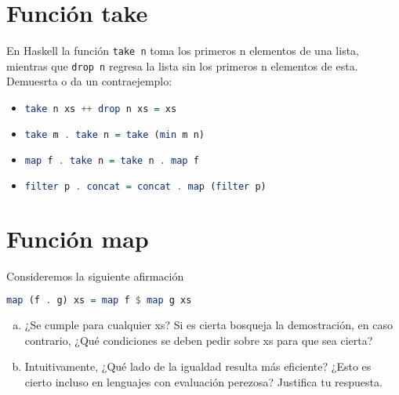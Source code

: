 \documentclass[spanish,12pt,letterpaper]{article}
\begin{document}
\section{Función take}
En Haskell la función \texttt{take n} toma los primeros n elementos de una lista,
mientras que \texttt{drop n} regresa la lista sin los primeros n elementos de
esta. Demuesrta o da un contraejemplo:
\begin{itemize}
\item
  \begin{lstlisting}[language=Haskell]
    take n xs ++ drop n xs = xs
  \end{lstlisting}

\item
  \begin{lstlisting}[language=Haskell]
    take m . take n = take (min m n)
  \end{lstlisting}

\item
  \begin{lstlisting}[language=Haskell]
    map f . take n = take n . map f
  \end{lstlisting}

\item
  \begin{lstlisting}[language=Haskell]
    filter p . concat = concat . map (filter p)
  \end{lstlisting}
\end{itemize}

\section{Función map}
Consideremos la siguiente afirmación
\begin{lstlisting}[language=Haskell]
  map (f . g) xs = map f $ map g xs
\end{lstlisting}
\begin{enumerate}[(a)]
\item ¿Se cumple para cualquier xs? Si es cierta bosqueja la demostración, en
  caso contrario, ¿Qué condiciones se deben pedir sobre xs para que sea cierta?
\item Intuitivamente, ¿Qué lado de la igualdad resulta más eficiente? ¿Esto es
  cierto incluso en lenguajes con evaluación perezosa? Justifica tu respuesta.
\end{enumerate}
\end{document}
